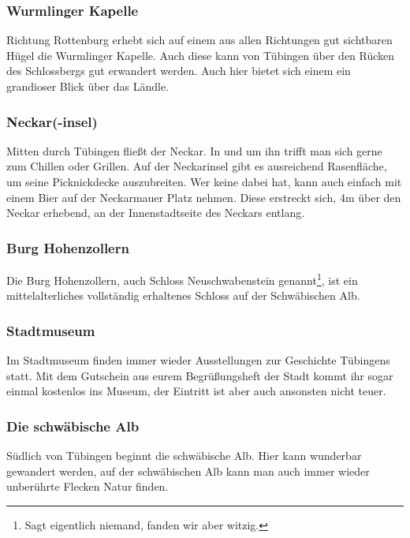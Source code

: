 \subsubsection*{Wurmlinger Kapelle}
Richtung Rottenburg erhebt sich auf einem aus allen Richtungen gut sichtbaren Hügel die Wurmlinger Kapelle. Auch diese kann von Tübingen über den Rücken des Schlossbergs gut erwandert werden. Auch hier bietet sich einem ein grandioser Blick über das Ländle.

\subsubsection*{Neckar(-insel)}
Mitten durch Tübingen fließt der Neckar. In und um ihn trifft man sich gerne zum Chillen oder Grillen. Auf der Neckarinsel gibt es ausreichend Rasenfläche, um seine Picknickdecke auszubreiten. Wer keine dabei hat, kann auch einfach mit einem Bier auf der Neckarmauer Platz nehmen. Diese erstreckt sich, 4m über den Neckar erhebend, an der Innenstadtseite des Neckars entlang.

\subsubsection*{Burg Hohenzollern}
Die Burg Hohenzollern, auch Schloss Neuschwabenstein genannt\footnote{Sagt eigentlich niemand, fanden wir aber witzig.}, ist ein mittelalterliches vollständig erhaltenes Schloss auf der Schwäbischen Alb.

\subsubsection*{Stadtmuseum}
Im Stadtmuseum finden immer wieder Ausstellungen zur Geschichte Tübingens statt. Mit dem Gutschein aus eurem Begrüßungsheft der Stadt kommt ihr sogar einmal kostenlos ins Museum, der Eintritt ist aber auch ansonsten nicht teuer.

\subsubsection*{Die schwäbische Alb}
Südlich von Tübingen beginnt die schwäbische Alb. Hier kann wunderbar gewandert werden, auf der schwäbischen Alb kann man auch immer wieder unberührte Flecken Natur finden.
\vfill
